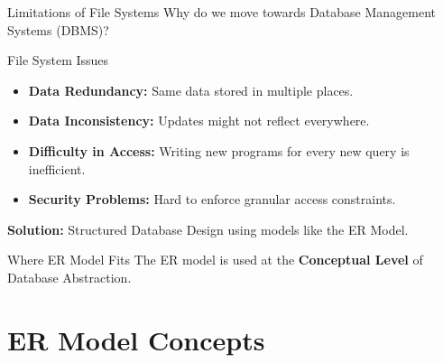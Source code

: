 \documentclass[aspectratio=169, xcolor=dvipsnames]{beamer}
\begin{document}
\begin{frame}{Limitations of File Systems}
    Why do we move towards Database Management Systems (DBMS)?
    
    \vspace{1em}
    
    \begin{alertblock}{File System Issues}
    \begin{itemize}
        \item \textbf{Data Redundancy:} Same data stored in multiple places.
        \item \textbf{Data Inconsistency:} Updates might not reflect everywhere.
        \item \textbf{Difficulty in Access:} Writing new programs for every new query is inefficient.
        \item \textbf{Security Problems:} Hard to enforce granular access constraints.
    \end{itemize}
    \end{alertblock}
    
    \vspace{0.5em}
    \textbf{Solution:} Structured Database Design using models like the ER Model.
\end{frame}

\begin{frame}{Where ER Model Fits}
    The ER model is used at the \textbf{Conceptual Level} of Database Abstraction.
    
    \vspace{2em}
    \centering
\end{frame}

\section{ER Model Concepts}
\end{document}
